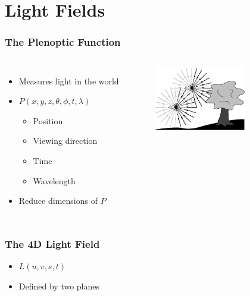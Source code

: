 \documentclass[12pt, compress]{beamer}
\begin{document}
\section{Light Fields}

\begin{frame}[fragile]
	\frametitle{The Plenoptic Function}
	
	\begin{columns}[onlytextwidth]
			\begin{itemize}
				\item \alert<1>{Measures light in the world}
				\item \alert<2>{$P(x, y, z, \theta, \phi, t, \lambda)$}
				\begin{itemize}
					\item \alert<3>{Position} %
					\item \alert<4>{Viewing direction} %
					\item \alert<5>{Time} %
					\item \alert<6>{Wavelength} %
				\end{itemize}
				\item \alert<7>{Reduce dimensions of $P$}
			\end{itemize}
			\begin{figure}
				\captionsetup{font=scriptsize}
				\includegraphics[width = 4cm]{images/plenoptic.png}
				\caption*{\cite{AdelsonBergen}}
			\end{figure}
	\end{columns}
	
\end{frame}

\begin{frame}[fragile]
	\frametitle{The 4D Light Field}
	
	\begin{itemize}
		\item $L(u, v, s, t)$
		\item Defined by two planes
	\end{itemize}
	\begin{center}
		
	\end{center}
\end{frame}
\end{document}
